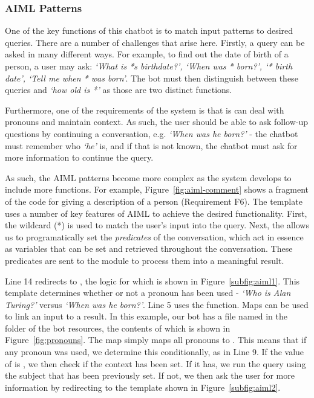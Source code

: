 \subsubsection{AIML Patterns}
One of the key functions of this chatbot is to match input patterns to desired queries. There are a number of challenges that arise here. Firstly, a query can be asked in many different ways. For example, to find out the date of birth of a person, a user may ask: {\it`What is *s birthdate?', `When was * born?', `* birth date', `Tell me when * was born'}. The bot must then distinguish between these queries and {\it`how old is *'} as those are two distinct functions.

Furthermore, one of the requirements of the system is that is can deal with pronouns and maintain context. As such, the user should be able to ask follow-up questions by continuing a conversation, e.g. {\it `When was he born?'} - the chatbot must remember who {\it `he'} is, and if that is not known, the chatbot must ask for more information to continue the query.

As such, the AIML patterns become more complex as the system develops to include more functions. For example, Figure~\ref{fig:aiml-comment} shows a fragment of the code for giving a description of a person (Requirement F6). The template uses a number of key features of AIML to achieve the desired functionality.
First, the wildcard (*) is used to match the user's input into the query. Next, the  allows us to programatically set the {\it{predicates}} of the conversation, which act in essence as variables that can be set and retrieved throughout the conversation. These predicates are sent to the  module to process them into a meaningful result.

Line 14 redirects to , the logic for which is shown in Figure~\ref{subfig:aiml1}.
This template determines whether or not a pronoun has been used - {\it{`Who is Alan Turing?'}} versus {\it{`When was he born?'}}. Line 5 uses the  function. Maps can be used to link an input to a result. In this example, our bot has a file named  in the  folder of the bot resources, the contents of which is shown in Figure~\ref{fig:pronouns}. The map simply maps all pronouns to . This means that if any pronoun was used, we determine this conditionally, as in Line 9. If the value of  is , we then check if the context has been set. If it has, we run the query using the subject that has been previously set. If not, we then ask the user for more information by redirecting to the template shown in Figure~\ref{subfig:aiml2}.

